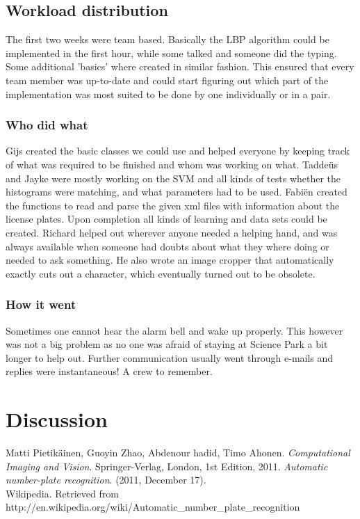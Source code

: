 \documentclass[a4paper]{article}
\begin{document}
\subsection{Workload distribution}

The first two weeks were team based. Basically the LBP algorithm could be
implemented in the first hour, while some talked and someone did the typing.
Some additional 'basics' where created in similar fashion. This ensured that
every team member was up-to-date and could start figuring out which part of the
implementation was most suited to be done by one individually or in a pair.

\subsubsection*{Who did what}
Gijs created the basic classes we could use and helped everyone by keeping
track of what was required to be finished and whom was working on what.
Tadde\"us and Jayke were mostly working on the SVM and all kinds of tests
whether the histograms were matching, and what parameters had to be used.
Fabi\"en created the functions to read and parse the given xml files with
information about the license plates. Upon completion all kinds of learning
and data sets could be created. Richard helped out wherever anyone needed a
helping hand, and was always available when someone had doubts about what they
where doing or needed to ask something. He also wrote an image cropper that
automatically exactly cuts out a character, which eventually turned out to be
obsolete.

\subsubsection*{How it went}

Sometimes one cannot hear the alarm bell and wake up properly. This however was
not a big problem as no one was afraid of staying at Science Park a bit longer
to help out. Further communication usually went through e-mails and replies
were instantaneous! A crew to remember.

\section{Discussion}


\begin{thebibliography}{9}
  Matti Pietik\"ainen, Guoyin Zhao, Abdenour hadid,
  Timo Ahonen.
  \emph{Computational Imaging and Vision}.
  Springer-Verlag, London,
  1st Edition,
  2011.
  \emph{Automatic number-plate recognition}. (2011, December 17).\\
  Wikipedia.
  Retrieved from http://en.wikipedia.org/wiki/Automatic\_number\_plate\_recognition
\end{thebibliography}
\end{document}

